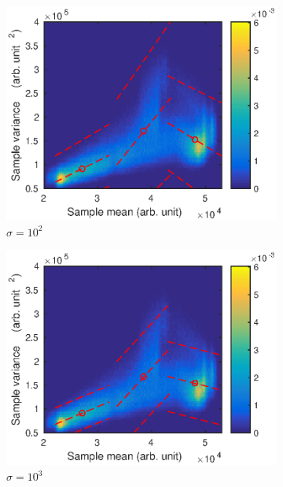 \documentclass[12pt]{report}
\begin{document}
\begin{figure}
	\centering
	\begin{subfigure}{0.45\textwidth}
		\includegraphics[width=\textwidth]{figures/meanVar/gaussian_1.eps}
		\caption{$\sigma=10^2$}
	\end{subfigure}
	\begin{subfigure}{0.45\textwidth}
		\includegraphics[width=\textwidth]{figures/meanVar/gaussian_2.eps}
		\caption{$\sigma=10^3$}
	\end{subfigure}
	\begin{subfigure}{0.45\textwidth}

\end{subfigure}
\end{figure}
\end{document}
